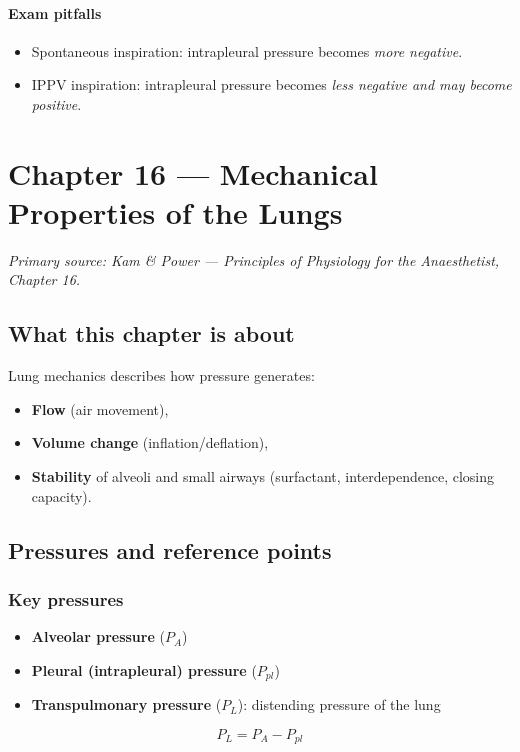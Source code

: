 \documentclass[11pt,a4paper]{article}
\begin{document}
\paragraph{Exam pitfalls}
\begin{itemize}[leftmargin=*,nosep]
  \item Spontaneous inspiration: intrapleural pressure becomes \emph{more negative}.
  \item IPPV inspiration: intrapleural pressure becomes \emph{less negative and may become positive}.
\end{itemize}


\section{Chapter 16 --- Mechanical Properties of the Lungs}
\textit{Primary source: Kam \& Power — \emph{Principles of Physiology for the Anaesthetist}, Chapter 16.}

\subsection{What this chapter is about}
Lung mechanics describes how pressure generates:
\begin{itemize}
  \item \textbf{Flow} (air movement),
  \item \textbf{Volume change} (inflation/deflation),
  \item \textbf{Stability} of alveoli and small airways (surfactant, interdependence, closing capacity).
\end{itemize}

\subsection{Pressures and reference points}
\subsubsection{Key pressures}
\begin{itemize}
  \item \textbf{Alveolar pressure} ($P_A$)
  \item \textbf{Pleural (intrapleural) pressure} ($P_{pl}$)
  \item \textbf{Transpulmonary pressure} ($P_L$): distending pressure of the lung
\end{itemize}
\[
P_L = P_A - P_{pl}
\]
\end{document}
